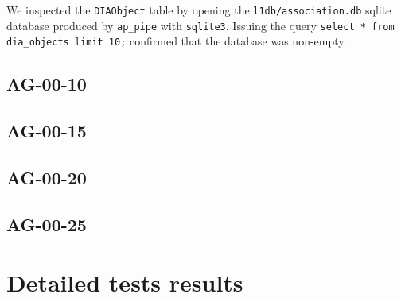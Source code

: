 \documentclass[DM,lsstdraft,STR,toc]{lsstdoc}
\begin{document}
We inspected the \texttt{DIAObject} table by opening the 
\texttt{l1db/association.db} sqlite database produced by \texttt{ap\_pipe} 
with \texttt{sqlite3}.  Issuing the query \texttt{select * from dia\_objects limit 10;} confirmed that the database was non-empty.


\subsection{AG-00-10}
\subsection{AG-00-15}
\subsection{AG-00-20}
\subsection{AG-00-25}

\appendix

\newpage
\section{Detailed tests results}
\end{document}
